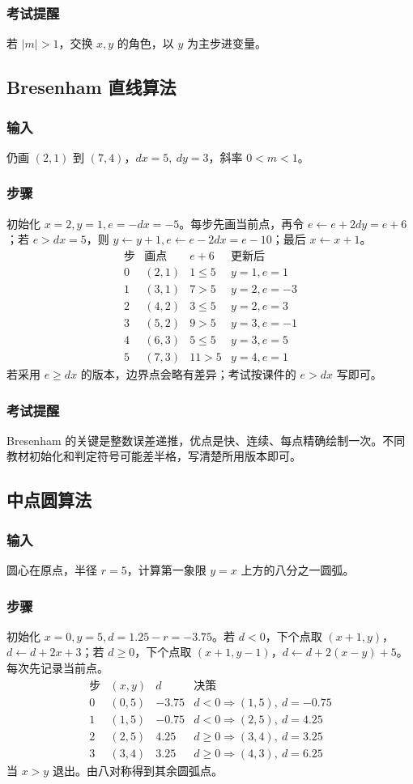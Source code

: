 \documentclass[UTF8,fontset=fandol,11pt]{ctexart}
\begin{document}
\subsubsection*{考试提醒}
若 $|m|>1$，交换 $x,y$ 的角色，以 $y$ 为主步进变量。

\subsection{Bresenham 直线算法}
\subsubsection*{输入}
仍画 $(2,1)$ 到 $(7,4)$，$dx=5,\ dy=3$，斜率 $0<m<1$。
\subsubsection*{步骤}
初始化 $x=2,y=1,e=-dx=-5$。每步先画当前点，再令 $e\leftarrow e+2dy=e+6$；若 $e>dx=5$，则 $y\leftarrow y+1,e\leftarrow e-2dx=e-10$；最后 $x\leftarrow x+1$。
\[
\begin{array}{c|c|c|c}
\text{步} & \text{画点} & e+6 & \text{更新后}\\
\hline
0&(2,1)&1\le5&y=1,e=1\\
1&(3,1)&7>5&y=2,e=-3\\
2&(4,2)&3\le5&y=2,e=3\\
3&(5,2)&9>5&y=3,e=-1\\
4&(6,3)&5\le5&y=3,e=5\\
5&(7,3)&11>5&y=4,e=1
\end{array}
\]
若采用 $e\ge dx$ 的版本，边界点会略有差异；考试按课件的 $e>dx$ 写即可。
\subsubsection*{考试提醒}
Bresenham 的关键是整数误差递推，优点是快、连续、每点精确绘制一次。不同教材初始化和判定符号可能差半格，写清楚所用版本即可。

\subsection{中点圆算法}
\subsubsection*{输入}
圆心在原点，半径 $r=5$，计算第一象限 $y=x$ 上方的八分之一圆弧。
\subsubsection*{步骤}
初始化 $x=0,y=5,d=1.25-r=-3.75$。若 $d<0$，下个点取 $(x+1,y)$，$d\leftarrow d+2x+3$；若 $d\ge0$，下个点取 $(x+1,y-1)$，$d\leftarrow d+2(x-y)+5$。每次先记录当前点。
\[
\begin{array}{c|c|c|c}
\text{步} &(x,y)&d&\text{决策}\\
\hline
0&(0,5)&-3.75&d<0\Rightarrow (1,5),\ d=-0.75\\
1&(1,5)&-0.75&d<0\Rightarrow (2,5),\ d=4.25\\
2&(2,5)&4.25&d\ge0\Rightarrow (3,4),\ d=3.25\\
3&(3,4)&3.25&d\ge0\Rightarrow (4,3),\ d=6.25
\end{array}
\]
当 $x>y$ 退出。由八对称得到其余圆弧点。
\end{document}
